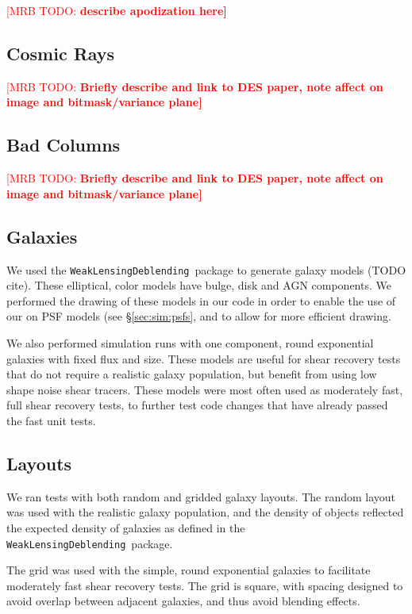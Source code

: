 \documentclass[iop, twocolappendix, appendixfloats, numberedappendix, apj]{hackemulateapj}
\newcommand{\mattodo}[1]{\textcolor{red}{[MRB TODO: \bf #1]}}
\newcommand{\descwl}{\texttt{WeakLensingDeblending}}
\begin{document}
\mattodo{describe apodization here}

\subsection{Cosmic Rays} \label{sec:sim:cosmics}

\mattodo{Briefly describe and link to DES paper, note affect on image and
bitmask/variance plane}

\subsection{Bad Columns} \label{sec:sim:badcols}

\mattodo{Briefly describe and link to DES paper, note affect on image and
bitmask/variance plane}

\subsection{Galaxies} \label{sec:sim:galaxies}

We used the \descwl\ package to generate galaxy models (TODO cite).  These
elliptical, color models have bulge, disk and AGN components. We performed the
drawing of these models in our code in order to enable the use of our on PSF
models (see \S \ref{sec:sim:psfs}, and to allow for more efficient drawing.

We also performed simulation runs with one component, round exponential
galaxies with fixed flux and size.  These models are useful for shear recovery
tests that do not require a realistic galaxy population, but benefit from using
low shape noise shear tracers.  These models were most often used as moderately
fast, full shear recovery tests, to further test code changes
that have already passed the fast unit tests.

\subsection{Layouts} \label{sec:sim:layouts}

We ran tests with both random and gridded galaxy layouts.  The random layout
was used with the realistic galaxy population, and the density of objects
reflected the expected density of galaxies as defined in the \descwl\ package.

The grid was used with the simple, round exponential galaxies to facilitate
moderately fast shear recovery tests.  The grid is square, with spacing
designed to avoid overlap between adjacent galaxies, and thus avoid blending
effects.
\end{document}
